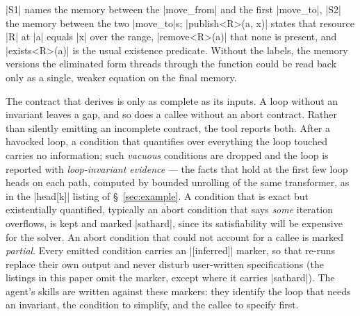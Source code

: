 \noindent |S1| names the memory between the |move_from| and the first |move_to|, |S2| the memory between the two |move_to|s; |publish<R>(a, x)| states that resource |R| at |a| equals |x| over the range, |remove<R>(a)| that none is present, and |exists<R>(a)| is the usual existence predicate.
Without the labels, the memory versions the eliminated form threads through the function could be read back only as a single, weaker equation on the final memory.

\label{sec:diagnostics}

The contract that \WP derives is only as complete as its inputs.
A loop without an invariant leaves a gap, and so does a callee without an abort contract.
Rather than silently emitting an incomplete contract, the tool reports both.
After a havocked loop, a condition that quantifies over everything the loop touched carries no information; such \emph{vacuous} conditions are dropped and the loop is reported with \emph{loop-invariant evidence} --- the facts that hold at the first few loop heads on each path, computed by bounded unrolling of the same transformer, as in the |head[k]| listing of \S~\ref{sec:example}.
A condition that is exact but existentially quantified, typically an abort condition that says \emph{some} iteration overflows, is kept and marked |sathard|, since its satisfiability will be expensive for the solver.
An abort condition that could not account for a callee is marked \emph{partial}.
Every emitted condition carries an |[inferred]| marker, so that re-runs replace their own output and never disturb user-written specifications (the listings in this paper omit the marker, except where it carries |sathard|).
The agent's skills are written against these markers: they identify the loop that needs an invariant, the condition to simplify, and the callee to specify first.

\label{sec:advantages}

